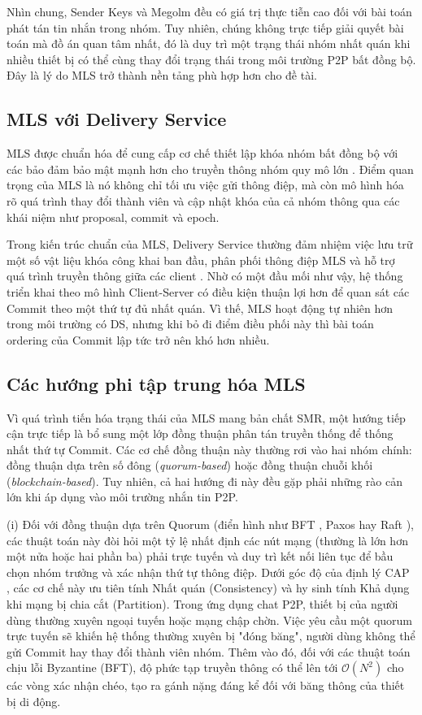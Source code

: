 \documentclass[../DoAn.tex]{subfiles}
\begin{document}
Nhìn chung, Sender Keys và Megolm đều có giá trị thực tiễn cao đối với bài toán phát tán tin nhắn trong nhóm. Tuy nhiên, chúng không trực tiếp giải quyết bài toán mà đồ án quan tâm nhất, đó là duy trì một trạng thái nhóm nhất quán khi nhiều thiết bị có thể cùng thay đổi trạng thái trong môi trường P2P bất đồng bộ. Đây là lý do MLS trở thành nền tảng phù hợp hơn cho đề tài.

\subsection{MLS với Delivery Service}

MLS được chuẩn hóa để cung cấp cơ chế thiết lập khóa nhóm bất đồng bộ với các bảo đảm bảo mật mạnh hơn cho truyền thông nhóm quy mô lớn \cite{rfc9420}. Điểm quan trọng của MLS là nó không chỉ tối ưu việc gửi thông điệp, mà còn mô hình hóa rõ quá trình thay đổi thành viên và cập nhật khóa của cả nhóm thông qua các khái niệm như proposal, commit và epoch.

Trong kiến trúc chuẩn của MLS, Delivery Service thường đảm nhiệm việc lưu trữ một số vật liệu khóa công khai ban đầu, phân phối thông điệp MLS và hỗ trợ quá trình truyền thông giữa các client \cite{rfc9750}. Nhờ có một đầu mối như vậy, hệ thống triển khai theo mô hình Client-Server có điều kiện thuận lợi hơn để quan sát các Commit theo một thứ tự đủ nhất quán. Vì thế, MLS hoạt động tự nhiên hơn trong môi trường có DS, nhưng khi bỏ đi điểm điều phối này thì bài toán ordering của Commit lập tức trở nên khó hơn nhiều.

\subsection{Các hướng phi tập trung hóa MLS}

Vì quá trình tiến hóa trạng thái của MLS mang bản chất SMR, một hướng tiếp cận trực tiếp là bổ sung một lớp đồng thuận phân tán truyền thống để thống nhất thứ tự Commit. Các cơ chế đồng thuận này thường rơi vào hai nhóm chính: đồng thuận dựa trên số đông (\textit{quorum-based}) hoặc đồng thuận chuỗi khối (\textit{blockchain-based}). Tuy nhiên, cả hai hướng đi này đều gặp phải những rào cản lớn khi áp dụng vào môi trường nhắn tin P2P. 

(i) Đối với đồng thuận dựa trên Quorum (điển hình như BFT \cite{castro1999pbft}, Paxos \cite{lamport2001paxos} hay Raft \cite{ongaro2014raft}), các thuật toán này đòi hỏi một tỷ lệ nhất định các nút mạng (thường là lớn hơn một nửa hoặc hai phần ba) phải trực tuyến và duy trì kết nối liên tục để bầu chọn nhóm trưởng và xác nhận thứ tự thông điệp. Dưới góc độ của định lý CAP \cite{gilbert2002brewers}, các cơ chế này ưu tiên tính Nhất quán (Consistency) và hy sinh tính Khả dụng khi mạng bị chia cắt (Partition). Trong ứng dụng chat P2P, thiết bị của người dùng thường xuyên ngoại tuyến hoặc mạng chập chờn. Việc yêu cầu một quorum trực tuyến sẽ khiến hệ thống thường xuyên bị "đóng băng", người dùng không thể gửi Commit hay thay đổi thành viên nhóm. Thêm vào đó, đối với các thuật toán chịu lỗi Byzantine (BFT), độ phức tạp truyền thông có thể lên tới $\mathcal{O}(N^2)$ cho các vòng xác nhận chéo, tạo ra gánh nặng đáng kể đối với băng thông của thiết bị di động.
\end{document}
